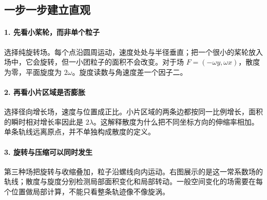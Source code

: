 \subsection*{一步一步建立直观}

\paragraph{1. 先看小桨轮，而非单个粒子}

选择纯旋转场。每个点沿圆周运动，速度处处与半径垂直；把一个很小的桨轮放入场中，它会旋转，但一小团粒子的面积不会改变。对于场 $F=(-\omega y,\omega x)$，散度为零，平面旋度为 $2\omega$。旋度读数与角速度差一个因子二。



\paragraph{2. 再看小片区域是否膨胀}

选择径向增长场，速度与位置成正比。小片区域的两条边都按同一比例增长，面积的瞬时相对增长率因此是 $2\lambda$。这解释散度为什么把不同坐标方向的伸缩率相加。单条轨线远离原点，并不单独构成散度的定义。



\paragraph{3. 旋转与压缩可以同时发生}

第三种场把旋转与收缩叠加，粒子沿螺线向内运动。右图展示的是这一常系数场的轨线；散度与旋度分别检测局部面积变化和局部转动。一般空间变化的场需要在每个位置做局部计算，不能只看整条轨迹像不像旋涡。
